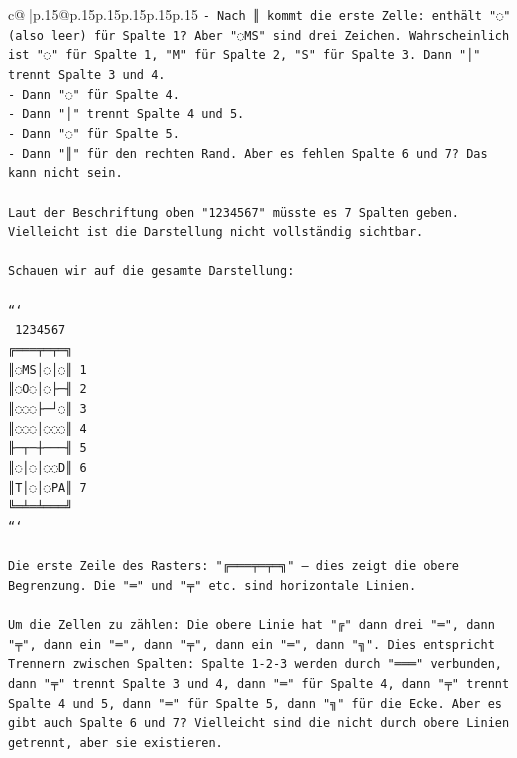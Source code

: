 \documentclass{article}
\begin{document}
{\begin{supertabular}{c@{$\;$}|p{.15\linewidth}@{}p{.15\linewidth}p{.15\linewidth}p{.15\linewidth}p{.15\linewidth}p{.15\linewidth}}
{{{\texttt{{-} Nach ║ kommt die erste Zelle: enthält "◌" (also leer) für Spalte 1? Aber "◌MS" sind drei Zeichen. Wahrscheinlich ist "◌" für Spalte 1, "M" für Spalte 2, "S" für Spalte 3. Dann "│" trennt Spalte 3 und 4.} \\
\texttt{{-} Dann "◌" für Spalte 4.} \\
\texttt{{-} Dann "│" trennt Spalte 4 und 5.} \\
\texttt{{-} Dann "◌" für Spalte 5.} \\
\texttt{{-} Dann "║" für den rechten Rand. Aber es fehlen Spalte 6 und 7? Das kann nicht sein.} \\
\\ 
\texttt{Laut der Beschriftung oben "1234567" müsste es 7 Spalten geben. Vielleicht ist die Darstellung nicht vollständig sichtbar.} \\
\\ 
\texttt{Schauen wir auf die gesamte Darstellung:} \\
\\ 
\texttt{```} \\
\texttt{ 1234567} \\
\texttt{╔═══╤═╤═╗} \\
\texttt{║◌MS│◌│◌║ 1} \\
\texttt{║◌O◌│◌├─╢ 2} \\
\texttt{║◌◌◌├─┘◌║ 3} \\
\texttt{║◌◌◌│◌◌◌║ 4} \\
\texttt{╟─┬─┼───╢ 5} \\
\texttt{║◌│◌│◌◌D║ 6} \\
\texttt{║T│◌│◌PA║ 7} \\
\texttt{╚═╧═╧═══╝} \\
\texttt{```} \\
\\ 
\texttt{Die erste Zeile des Rasters: "╔═══╤═╤═╗" – dies zeigt die obere Begrenzung. Die "═" und "╤" etc. sind horizontale Linien.} \\
\\ 
\texttt{Um die Zellen zu zählen: Die obere Linie hat "╔" dann drei "═", dann "╤", dann ein "═", dann "╤", dann ein "═", dann "╗". Dies entspricht Trennern zwischen Spalten: Spalte 1{-}2{-}3 werden durch "═══" verbunden, dann "╤" trennt Spalte 3 und 4, dann "═" für Spalte 4, dann "╤" trennt Spalte 4 und 5, dann "═" für Spalte 5, dann "╗" für die Ecke. Aber es gibt auch Spalte 6 und 7? Vielleicht sind die nicht durch obere Linien getrennt, aber sie existieren.} \\
\\ 
}}}
\end{supertabular}}
\end{document}
